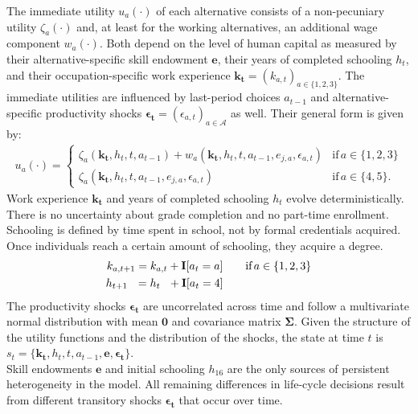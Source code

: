 \noindent The immediate utility $u_a(\cdot)$ of each alternative consists of a non-pecuniary utility $\zeta_a(\cdot)$ and, at least for the working alternatives, an additional wage component $w_a(\cdot)$. Both depend on the level of human capital as measured by their alternative-specific skill endowment $\bm{e}$, their years of completed schooling $h_t$, and their occupation-specific work experience $\bm{k_t} = \left(k_{a,t}\right)_{a\in\{1, 2, 3\}}$. The immediate utilities are influenced by last-period choices $a_{t -1}$ and alternative-specific productivity shocks $\bm{\epsilon_t} = \left(\epsilon_{a,t}\right)_{a\in\mathcal{A}}$ as well. Their general form is given by:
%
\begin{align*}
u_a(\cdot) =
\begin{cases}
    \zeta_a(\bm{k_t}, h_t, t, a_{t -1})  + w_a(\bm{k_t}, h_t, t, a_{t -1}, e_{j, a}, \epsilon_{a,t})                & \text{if}\, a \in \{1, 2, 3\}  \\
    \zeta_a(\bm{k_t}, h_t, t, a_{t-1}, e_{j,a}, \epsilon_{a,t})                                                  &  \text{if}\, a \in \{4, 5\}.
\end{cases}
\end{align*}
%
\noindent Work experience $\bm{k_t}$  and years of completed schooling $h_t$ evolve deterministically. There is no uncertainty about grade completion \citep{Altonji.1993} and no part-time enrollment. Schooling is defined by time spent in school, not by formal credentials acquired. Once individuals reach a certain amount of schooling, they acquire a degree.
%
\begin{align*}
k_{a,t+1} = k_{a,t} + {\textbf{I}}[a_t = a]  &\qquad \text{if}\, a \in \{1, 2, 3\} \\
h_{t + 1\phantom{,a}} = h_{t\phantom{,a}} +   {\textbf{I}}[a_t = 4]  &\qquad
\end{align*}
%
\noindent The productivity shocks $\bm{\epsilon_t}$ are uncorrelated across time and follow a multivariate normal distribution with mean $\bm{0}$ and covariance matrix $\bm{\Sigma}$. Given the structure of the utility functions and the distribution of the shocks, the state at time $t$ is $s_t = \{\bm{k_t}, h_t, t, a_{t -1}, \bm{e},\bm{\epsilon_t}\}$.\\

\noindent Skill endowments $\bm{e}$ and initial schooling $h_{16}$ are the only sources of persistent heterogeneity in the model. All remaining differences in life-cycle decisions result from different transitory shocks $\bm{\epsilon_t}$ that occur over time.\\


